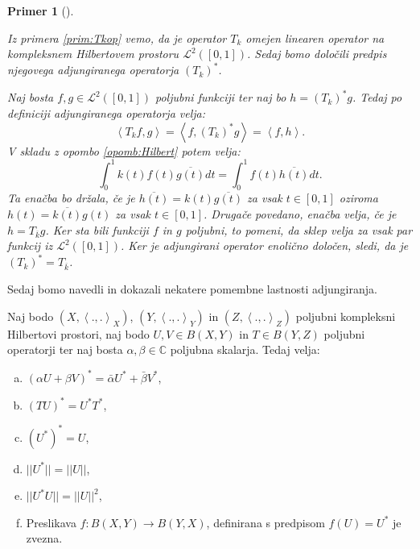 \documentclass[12pt,a4paper,oneside,fleqn,openany]{book}
\newtheorem{primer*}[izrek]{Primer}
\newenvironment{primer}[1][]{\begin{primer*}[#1]\renewcommand*{\qedsymbol}{$\diamondsuit$}\pushQED{\qed}}{\popQED\end{primer*}}
\newcommand{\C}{\mathbb{C}}
\newcommand{\abs}[1]{\ensuremath{\lvert #1 \rvert}}
\newcommand{\norm}[1]{\abs{\abs{#1}}}
\newcommand{\Sp}[2]{\ensuremath{\left<#1, #2\right>}}
\newcommand{\map}[3]{\ensuremath{{#1}:{#2}\rightarrow{#3}}}
\begin{document}
\begin{primer}
	\label{prim:adjop2} 
	
	Iz primera \ref{prim:Tkop} vemo, da je operator $T_k$ omejen linearen operator na kompleksnem Hilbertovem prostoru $\mathcal{L}^2([0, 1])$. Sedaj bomo določili predpis njegovega adjungiranega operatorja $(T_k)^*$.
	
	Naj bosta $f, g \in \mathcal{L}^2([0, 1])$ poljubni funkciji ter naj bo $h = (T_k)^*g$. Tedaj po definiciji adjungiranega operatorja velja: $$\Sp{T_kf}{g} = \Sp{f}{(T_k)^*g} = \Sp{f}{h}.$$
	V skladu z opombo \ref{opomb:Hilbert} potem velja: $$\int_{0}^{1}k(t)f(t)\overline{g(t)}dt = \int_{0}^{1}f(t)\overline{h(t)}dt.$$
	Ta enačba bo držala, če je $\overline{h(t)} = k(t)\overline{g(t)}$ za vsak $t\in [0, 1]$ oziroma $h(t) = \overline{k(t)}g(t)$ za vsak $t\in [0, 1]$. Drugače povedano, enačba velja, če je $h = T_{\overline{k}}g$. Ker sta bili funkciji $f$ in $g$ poljubni, to pomeni, da sklep velja za vsak par funkcij iz $\mathcal{L}^2([0, 1])$. Ker je adjungirani operator enolično določen, sledi, da je $(T_k)^* = T_{\overline{k}}$.
\end{primer}

Sedaj bomo navedli in dokazali nekatere pomembne lastnosti adjungiranja.

\begin{izrek}
	\label{izr:adjlast}
	Naj bodo $(X, \Sp{.}{.}_X)$, $(Y, \Sp{.}{.}_Y)$ in $(Z, \Sp{.}{.}_Z)$ poljubni kompleksni Hilbertovi prostori, naj bodo $U, V \in B(X, Y)$ in $T \in B(Y, Z)$ poljubni operatorji ter naj bosta $\alpha, \beta \in \C$ poljubna skalarja. Tedaj velja: \begin{enumerate}[a)]
		\item $(\alpha U + \beta V)^* = \bar{\alpha}U^* + \bar{\beta}V^*$,
		\item $(TU)^* = U^*T^*$,
		\item $(U^*)^* = U$,
		\item $\norm{U^*} = \norm{U}$,
		\item $\norm{U^*U} = \norm{U}^2$,
		\item Preslikava $\map{f}{B(X, Y)}{B(Y, X)}$, definirana s predpisom $f(U) = U^*$ je zvezna.
	\end{enumerate}
\end{izrek}
\end{document}
